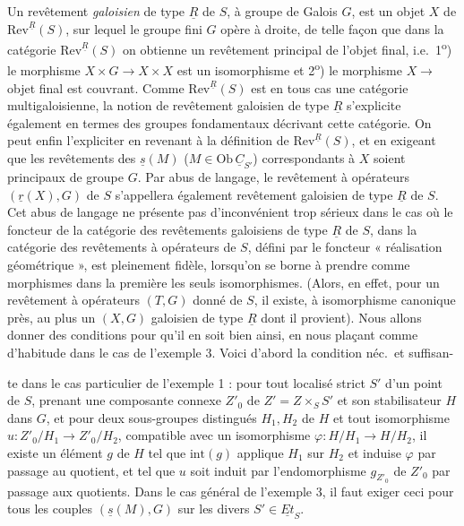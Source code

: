 \documentclass[11pt,a4paper]{article}
\begin{document}
Un revêtement \emph{galoisien} de type $\underline{R}$ de $S$, à groupe de
Galois $G$, est un objet $X$ de $\mathrm{Rev}^{\underline{R}}(S)$, sur lequel
le groupe fini $G$ opère à droite, de telle façon que dans la catégorie
$\mathrm{Rev}^{\underline{R}}(S)$ on obtienne un revêtement principal de
l'objet final, i.e.\ 1\textsuperscript{o}) le morphisme
$X \times G \to X \times X$ est un isomorphisme et 2\textsuperscript{o}) le
morphisme $X \to$ objet final est couvrant. Comme
$\mathrm{Rev}^{\underline{R}}(S)$ est en tous cas une catégorie
multigaloisienne, la notion de revêtement galoisien de type $\underline{R}$
s'explicite également en termes des groupes fondamentaux décrivant cette
catégorie. On peut enfin l'expliciter en revenant à la définition de
$\mathrm{Rev}^{\underline{R}}(S)$, et en exigeant que les revêtements des
$\underline{s}(M)$ ($M \in \mathrm{Ob}\,\underline{C}_{S'}$) correspondants à
$X$ soient principaux de groupe $G$. Par abus de langage, le revêtement à
opérateurs $(\underline{r}(X), G)$ de $S$ s'appellera également revêtement
galoisien de type $\underline{R}$ de $S$. Cet abus de langage ne présente pas
d'inconvénient trop sérieux dans le cas où le foncteur de la catégorie des
revêtements galoisiens de type $\underline{R}$ de $S$, dans la catégorie des
revêtements à opérateurs de $S$, défini par le foncteur « réalisation
géométrique », est pleinement fidèle, lorsqu'on se borne à prendre comme
morphismes dans la première les seuls isomorphismes. (Alors, en effet, pour un
revêtement à opérateurs $(T, G)$ donné de $S$, il existe, à isomorphisme
canonique près, au plus un $(X, G)$ \struck{\ill{}} galoisien de type
$\underline{R}$ dont il provient). Nous allons donner des conditions pour qu'il
en soit bien ainsi, en nous plaçant comme d'habitude dans le cas de l'exemple
3. Voici d'abord la condition néc.\ et suffisan-

te dans le cas particulier de l'exemple 1 : pour tout localisé strict $S'$ d'un
point de $S$, prenant une composante connexe $Z'_0$ de $Z' = Z \times_S S'$ et
son stabilisateur $H$ dans $G$, et pour deux sous-groupes distingués
$H_1, H_2$ de $H$ et tout isomorphisme $u : Z'_0/H_1 \to Z'_0/H_2$,
\struck{\ill{}} compatible avec un isomorphisme
$\varphi : H/H_1 \to H/H_2$, il existe un élément $g$ de $H$ tel que
$\mathrm{int}(g)$ applique $H_1$ sur $H_2$ et induise $\varphi$ par passage au
quotient, et tel que $u$ soit induit par l'endomorphisme $g_{Z'_0}$ de $Z'_0$
par passage aux quotients. Dans le cas général de l'exemple 3, il faut exiger
ceci pour tous les couples $(\underline{s}(M), G)$ sur les divers
$S' \in \underline{Et}_S$.
\end{document}
